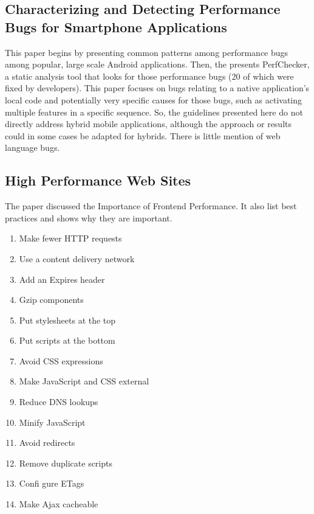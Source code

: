 \documentclass{acm_proc_article-sp}
\begin{document}
\subsection{Characterizing and Detecting Performance Bugs for Smartphone Applications\cite{liu2014characterizing} }
This paper begins by presenting common patterns among performance bugs among popular, large scale Android applications. Then, the presents PerfChecker, a static analysis tool that looks for those performance bugs (20 of which were fixed by developers). This paper focuses on bugs relating to a native application’s local code and potentially very specific causes for those bugs, such as activating multiple features in a specific sequence. So, the guidelines presented here do not directly address hybrid mobile applications, although the approach or results could in some cases be adapted for hybrids. There is little mention of web language bugs.

\subsection{High Performance Web Sites\cite{souders2008high}}
The paper discussed the Importance of Frontend Performance. It also list best practices and shows why they are important. 

\begin{enumerate}
	\item Make fewer HTTP requests
	\item Use a content delivery network
	\item Add an Expires header
	\item Gzip components
	\item Put stylesheets at the top
	\item Put scripts at the bottom
	\item Avoid CSS expressions
	\item Make JavaScript and CSS external
	\item Reduce DNS lookups
	\item Minify JavaScript
	\item Avoid redirects
	\item Remove duplicate scripts
	\item Confi gure ETags
	\item Make Ajax cacheable
\end{enumerate}




\end{document}
